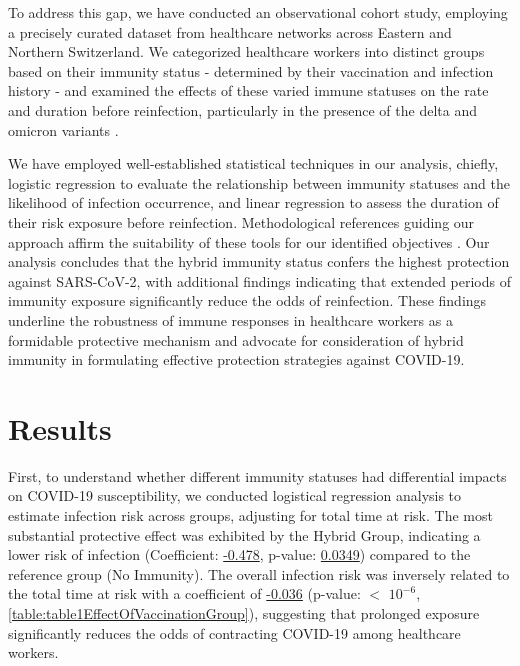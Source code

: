 \documentclass[11pt]{article}
\begin{document}
To address this gap, we have conducted an observational cohort study, employing a precisely curated dataset from healthcare networks across Eastern and Northern Switzerland. We categorized healthcare workers into distinct groups based on their immunity status - determined by their vaccination and infection history - and examined the effects of these varied immune statuses on the rate and duration before reinfection, particularly in the presence of the delta and omicron variants \cite{Cui2020CoAIDCH,Ferry2020PredictorsOU}.

We have employed well-established statistical techniques in our analysis, chiefly, logistic regression to evaluate the relationship between immunity statuses and the likelihood of infection occurrence, and linear regression to assess the duration of their risk exposure before reinfection. Methodological references guiding our approach affirm the suitability of these tools for our identified objectives \cite{Katzman2016DeepSurvPT,Lin1989TheRI,Simon2011RegularizationPF}. Our analysis concludes that the hybrid immunity status confers the highest protection against SARS-CoV-2, with additional findings indicating that extended periods of immunity exposure significantly reduce the odds of reinfection. These findings underline the robustness of immune responses in healthcare workers as a formidable protective mechanism and advocate for consideration of hybrid immunity in formulating effective protection strategies against COVID-19.

\section*{Results}
First, to understand whether different immunity statuses had differential impacts on COVID-19 susceptibility, we conducted logistical regression analysis to estimate infection risk across groups, adjusting for total time at risk. The most substantial protective effect was exhibited by the Hybrid Group, indicating a lower risk of infection (Coefficient: \hyperlink{A4a}{-0.478}, p-value: \hyperlink{A4d}{0.0349}) compared to the reference group (No Immunity). The overall infection risk was inversely related to the total time at risk with a coefficient of \hyperlink{A5a}{-0.036} (p-value: $<$ \hyperlink{A5d}{$10^{-6}$}, \ref{table:table1EffectOfVaccinationGroup}), suggesting that prolonged exposure significantly reduces the odds of contracting COVID-19 among healthcare workers.
\end{document}
